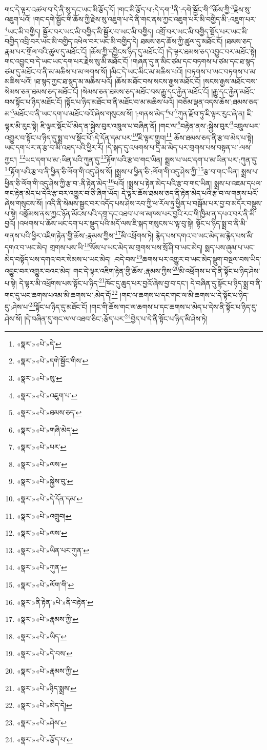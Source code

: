 གང་དེ་ལྟར་འཚལ་བ་དེ་ནི་སུ་དང་ཡང་མི་རྩོད་དོ། །གང་མི་རྩོད་པ་:དེ་དག་\footnote{«སྣར་»«པེ་»དེ་}ནི་:དགེ་སྦྱོང་གི་\footnote{«སྣར་»«པེ་»དགེ་སྦྱོང་གིས་}ཆོས་ཀྱི་\footnote{«སྣར་»«པེ་»སུ་}རྗེས་སུ་འཇུག་པའོ། །གང་དགེ་སྦྱོང་གི་ཆོས་ཀྱི་རྗེས་སུ་འཇུག་པ་དེ་ནི་གང་ནས་ཀྱང་འཇུག་པར་མི་བགྱིད་མི་:འཇུག་པར་\footnote{«སྣར་»«པེ་»འཇུག་པ་}ཡང་མི་བགྱིད། སྦྱོར་བར་ཡང་མི་བགྱིད་མི་སྦྱོར་བ་ཡང་མི་བགྱིད། འགྲོ་བར་ཡང་མི་བགྱིད་སྡོད་པར་ཡང་མི་བགྱིད་འབྲི་བར་ཡང་མི་བགྱིད་འཕེལ་བར་ཡང་མི་བགྱིད་དེ། ཐམས་ཅད་ཆོས་ཀྱི་ཚུལ་དུ་མཐོང་ངོ། །ཐམས་ཅད་རྣམ་པར་གྲོལ་བའི་ཚུལ་དུ་མཐོང་ངོ། །ཆོས་ཀྱི་དབྱིངས་ཉིད་དུ་མཐོང་ངོ། །དེ་ལྟར་ཐམས་ཅད་འབྱུང་བར་མཐོང་སྟེ། གང་འབྱུང་བ་དེ་ཡང་ཡང་དག་པར་རྗེས་སུ་མི་མཐོང་ངོ། །གཞན་དུ་ན་མིང་ཙམ་དང་བཏགས་པ་ཙམ་དང་ཐ་སྙད་ཙམ་དུ་མཐོང་བ་ནི་མ་མཆིས་པ་མ་ལགས་སོ། །མིང་དེ་ཡང་མིང་མ་མཆིས་པའོ། །བཏགས་པ་ཡང་བཏགས་པ་མ་མཆིས་པའོ། །ཐ་སྙད་ཀྱང་ཐ་སྙད་མ་མཆིས་པའོ། །ཆོས་མཐོང་བས་སངས་རྒྱས་མཐོང་ངོ། །སངས་རྒྱས་མཐོང་བས་སེམས་ཅན་ཐམས་ཅད་མཐོང་ངོ། །སེམས་ཅན་ཐམས་ཅད་མཐོང་བས་རྒྱུ་དང་རྐྱེན་མཐོང་ངོ། །རྒྱུ་དང་རྐྱེན་མཐོང་བས་སྟོང་པ་ཉིད་མཐོང་ངོ། །སྟོང་པ་ཉིད་མཐོང་བ་ནི་མཐོང་བ་མ་མཆིས་པའོ། །བཅོམ་ལྡན་འདས་ཆོས་:ཐམས་ཅད་མ་\footnote{«སྣར་»«པེ་»ཐམས་ཅད་}མཐོང་བ་ནི་ཡང་དག་པ་མཐོང་བའོ་ཞེས་གསུངས་སོ། །:གནས་མེད་\footnote{«སྣར་»«པེ་»གཞི་མེད་}པ་\footnote{«སྣར་»«པེ་»པར་}ཀུན་རྫོབ་ཏུ་ཇི་ལྟར་རུང་ཞེ་ན། ཇི་ལྟར་མི་རུང་སྟེ། ཇི་ལྟར་སྡོང་པོ་མེད་ན་སྐྱེས་བུར་འཁྲུལ་པ་བཞིན་ནོ། །གང་ལ་\footnote{«སྣར་»«པེ་»ལས་}བརྟེན་ནས་:སྐྱེས་བུར་\footnote{«སྣར་»«པེ་»སྐྱེས་བུ་}འཁྲུལ་པར་འགྱུར་བ་སྟོང་པ་ཉིད་དུ་སྨྲ་བ་ལ་སྡོང་པོ་:དེ་དོན་དམ་པར་\footnote{«སྣར་»«པེ་»དེ་དོན་དམ་}ཇི་ལྟར་གྲུབ།\footnote{«སྣར་»«པེ་»འགྲུབ།} ཆོས་ཐམས་ཅད་ནི་རྩ་བ་མེད་པ་སྟེ། ཡང་དག་པར་ན་རྩ་བ་མི་འཐད་པའི་ཕྱིར་རོ། །དེ་སྐད་དུ་འཕགས་པ་དྲི་མ་མེད་པར་གྲགས་པས་བསྟན་པ་:ལས་ཀྱང་། \footnote{«སྣར་»«པེ་»ལས་}ཡང་དག་པ་མ་:ཡིན་པའི་ཀུན་དུ་\footnote{«སྣར་»«པེ་»ཡིན་པར་ཀུན་}རྟོག་པའི་རྩ་བ་གང་ཡིན། སྨྲས་པ་ཡང་དག་པ་མ་ཡིན་པར་:ཀུན་དུ་\footnote{«སྣར་»«པེ་»ཀུན་}རྟོག་པའི་རྩ་བ་ནི་ཕྱིན་ཅི་ལོག་གི་འདུ་ཤེས་སོ། །སྨྲས་པ་ཕྱིན་ཅི་:ལོག་གི་འདུ་ཤེས་ཀྱི་\footnote{«སྣར་»«པེ་»ལོག་གི་}རྩ་བ་གང་ཡིན། སྨྲས་པ་ཕྱིན་ཅི་ལོག་གི་འདུ་ཤེས་ཀྱི་རྩ་བ་:ནི་རྟེན་མེད་\footnote{«སྣར་»ནི་རྟེན་«པེ་»ནི་བརྟེན་}པའོ། །སྨྲས་པ་རྟེན་མེད་པའི་རྩ་བ་གང་ཡིན། སྨྲས་པ་འཇམ་དཔལ་གང་རྟེན་མེད་པ་དེའི་རྩ་བར་འགྱུར་བ་ཅི་ཞིག་ཡོད། དེ་ལྟར་ཆོས་ཐམས་ཅད་ནི་རྟེན་མེད་པའི་རྩ་བ་ལ་གནས་པའོ་ཞེས་གསུངས་སོ། །འདི་ནི་སེམས་སྦྱང་བར་འདོད་པས་ཤེས་རབ་ཀྱི་ཕ་རོལ་ཏུ་ཕྱིན་པ་བསྒོམ་པར་བྱ་བ་མདོར་བསྡུས་པ་སྟེ། བསྒོམས་ནས་ཀྱང་ཉོན་མོངས་པའི་དགྲ་དང་འཐབ་པ་ལ་མཁས་པར་བྱའི་རང་གི་ཁྱིམ་ན་དཔའ་བར་ནི་མི་བྱའོ། །འཕགས་པ་ཆོས་ཡང་དག་པར་སྡུད་པའི་མདོ་ལས་ཇི་སྐད་གསུངས་པ་ལྟ་བུ་སྟེ། སྟོང་པ་ཉིད་སྨྲ་བ་ནི་མི་གནས་པའི་ཕྱིར་འཇིག་རྟེན་གྱི་ཆོས་:རྣམས་ཀྱིས་\footnote{«སྣར་»«པེ་»རྣམས་ཀྱི་}མི་འཕྲོགས་ཏེ། རྙེད་པས་དགའ་བ་ཡང་མེད་མ་རྙེད་པས་མི་དགའ་བ་ཡང་མེད། གྲགས་པས་ཡི་\footnote{«སྣར་»«པེ་»ཡིད་}སོས་པ་ཡང་མེད་མ་གྲགས་པས་སྲོ་ཤི་བ་ཡང་མེད། སྨད་པས་ཞུམ་པ་ཡང་མེད་བསྟོད་པས་དགའ་བར་སེམས་པ་ཡང་མེད། :བདེ་བས་\footnote{«སྣར་»«པེ་»དེ་བས་}ཆགས་པར་འགྱུར་བ་ཡང་མེད་སྡུག་བསྔལ་བས་ཡིད་འབྱུང་བར་འགྱུར་བའང་མེད། གང་དེ་ལྟར་འཇིག་རྟེན་གྱི་ཆོས་:རྣམས་ཀྱིས་\footnote{«སྣར་»«པེ་»རྣམས་ཀྱི་}མི་འཕྲོགས་པ་དེ་ནི་སྟོང་པ་ཉིད་ཤེས་པ་སྟེ། དེ་ལྟར་མི་འཕྲོགས་པས་སྟོང་པ་ཉིད་\footnote{«སྣར་»«པེ་»ཉིད་སྨྲས་}ཁོང་དུ་ཆུད་པར་བྱའོ་ཞེས་བྱ་བ་དང་། དེ་བཞིན་དུ་སྟོང་པ་ཉིད་སྨྲ་བ་ནི་གང་དུ་ཡང་ཆགས་པའམ་མི་ཆགས་པ་:མེད་དོ།\footnote{«སྣར་»«པེ་»མེད་དེ།} །གང་ལ་ཆགས་པ་དང་གང་ལ་མི་ཆགས་པ་དེ་སྟོང་པ་ཉིད་དུ་:ཤེས་པ་\footnote{«སྣར་»«པེ་»ཤེས་}སྟོང་པ་ཉིད་དུ་མཐོང་ངོ། །གང་གི་ཆོས་གང་ལ་ཆགས་པ་དང་ཆགས་པ་མེད་པ་དེས་ནི་སྟོང་པ་ཉིད་དུ་ཤེས་སོ། །དེ་བཞིན་དུ་གང་ལ་ལ་འཐབ་ཅིང་:རྩོད་པར་\footnote{«སྣར་»«པེ་»རྩོད་པ་}བྱེད་པ་དེ་ནི་སྟོང་པ་ཉིད་མི་ཤེས་ཏེ། 